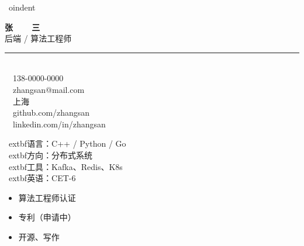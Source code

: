 \documentclass[UTF8,a4paper,10.5pt]{ctexart}
\begin{document}
\color{bodytext}


\
oindent
\begin{minipage}[t]{0.28\paperwidth}
  \color{white}
  \vspace{1.5cm}
  \hspace{0.9cm}
  \begin{minipage}[t]{0.18\paperwidth}
    {\sffamily\bfseries\Huge 张~~~~三}\\[0.35em]
    {\small\color{muted} 后端 / 算法工程师}\\[0.9em]
    {\color{accent}\rule{\linewidth}{0.6pt}}\\[0.7em]

    {\small
      \faPhone~~138-0000-0000\\[0.25em]
      \faEnvelope~~zhangsan@mail.com\\[0.25em]
      \faMapMarker~~上海\\[0.25em]
      \faGithub~~github.com/zhangsan\\[0.25em]
      \faLinkedin~~linkedin.com/in/zhangsan}

    {\small
      \	extbf{语言}：C++ / Python / Go\\[0.2em]
      \	extbf{方向}：分布式系统\\[0.2em]
      \	extbf{工具}：Kafka、Redis、K8s\\[0.2em]
      \	extbf{英语}：CET-6}

    {\small
      \begin{itemize}
        \item 算法工程师认证
        \item 专利（申请中）
        \item 开源、写作
      \end{itemize}}
  \end{minipage}
\end{minipage}%
\end{document}
